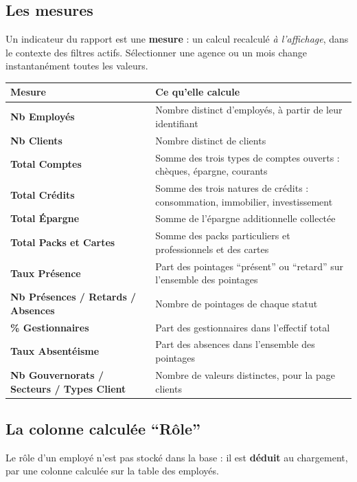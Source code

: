 \documentclass[a4paper,11pt]{article}
\begin{document}
\subsection{Les mesures}

Un indicateur du rapport est une \textbf{mesure} : un calcul recalculé
\emph{à l'affichage}, dans le contexte des filtres actifs. Sélectionner une
agence ou un mois change instantanément toutes les valeurs.

\noindent\begin{tabularx}{\textwidth}{|>{\bfseries}L{4.1cm}|X|}
\hline
\textmd{\textbf{Mesure}} & \textbf{Ce qu'elle calcule}\\
\hline
Nb Employés & Nombre distinct d'employés, à partir de leur identifiant\\
\hline
Nb Clients & Nombre distinct de clients\\
\hline
Total Comptes & Somme des trois types de comptes ouverts : chèques, épargne, courants\\
\hline
Total Crédits & Somme des trois natures de crédits : consommation, immobilier, investissement\\
\hline
Total Épargne & Somme de l'épargne additionnelle collectée\\
\hline
Total Packs et Cartes & Somme des packs particuliers et professionnels et des cartes\\
\hline
Taux Présence & Part des pointages \enquote{présent} ou \enquote{retard} sur l'ensemble des pointages\\
\hline
Nb Présences / Retards / Absences & Nombre de pointages de chaque statut\\
\hline
\% Gestionnaires & Part des gestionnaires dans l'effectif total\\
\hline
Taux Absentéisme & Part des absences dans l'ensemble des pointages\\
\hline
Nb Gouvernorats / Secteurs / Types Client & Nombre de valeurs distinctes, pour la page clients\\
\hline
\end{tabularx}

\subsection{La colonne calculée \enquote{Rôle}}

Le rôle d'un employé n'est pas stocké dans la base : il est \textbf{déduit} au
chargement, par une colonne calculée sur la table des employés.
\end{document}
